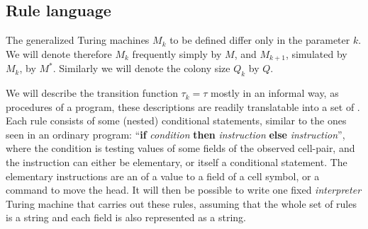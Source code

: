 \documentclass[11pt]{memoir}
\theoremstyle{definition} %
\newcommand{\Q}{Q} %
\begin{document}


\subsection{Rule language}\label{sec:language}

The generalized Turing machines \( M_{k} \) to be defined
differ only in the parameter \( k \).
We will denote therefore \( M_{k} \) frequently simply by \( M \),
and \( M_{k+1} \), simulated by \( M_{k} \),  by \( M^{*} \).
Similarly we will denote the colony size \( \Q_{k} \) by \( \Q \).

We will describe the transition function
\( \tau_{k}=\tau \)  mostly in an informal way, as procedures of a program,
these descriptions are readily translatable into a set of .
Each rule consists of some (nested) conditional statements,
similar to the ones seen in an ordinary program:
 ``\textbf{if} \textit{condition} \textbf{then} \textit{instruction}
\textbf{else} \textit{instruction}'', 
where the condition is testing values of some fields of the observed cell-pair, and
the instruction can either be elementary, or itself a conditional statement. 
The elementary instructions are an  of a value to a field
of a cell symbol, or a command to move the head.
It will then be possible to write one fixed \emph{interpreter} Turing machine that carries
out these rules, assuming that the whole set of rules is a string and each field is also represented
as a string.
\end{document}

